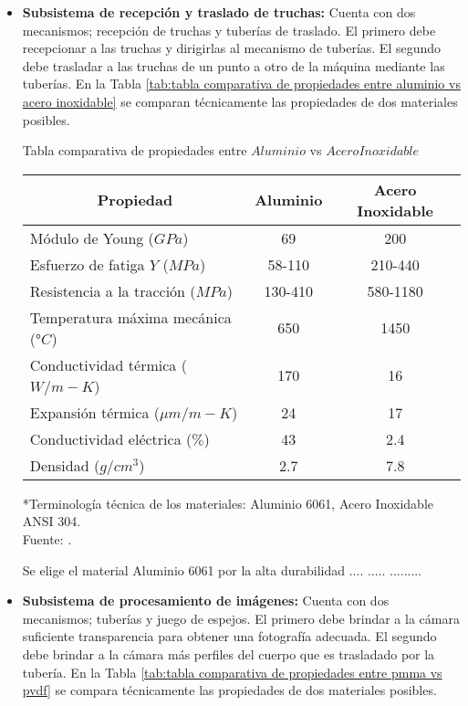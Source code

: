 \begin{itemize}
	\item \textbf{Subsistema de recepción y traslado de truchas:} Cuenta con dos mecanismos; recepción de truchas y tuberías de traslado. El primero debe recepcionar a las truchas y dirigirlas al mecanismo de tuberías. El segundo debe trasladar a las truchas de un punto a otro de la máquina mediante las tuberías. En la Tabla \ref{tab:tabla comparativa de propiedades entre aluminio vs acero inoxidable} se comparan técnicamente las propiedades de dos materiales posibles.
	
	\begin{mytable}[H]
		\centering
		\caption{Tabla comparativa de propiedades entre $Aluminio$ vs $Acero Inoxidable$}
		\label{tab:tabla comparativa de propiedades entre aluminio vs acero inoxidable}
		\begin{tabular}{|l|c|c|}
			\hline
			\multicolumn{1}{|c|}{\textbf{Propiedad}} & \textbf{Aluminio} & \textbf{Acero Inoxidable} \\ \hline
			Módulo de Young ($GPa$) & 69 & 200 \\ \hline
			Esfuerzo de fatiga $Y$ ($MPa$) & 58-110 & 210-440 \\ \hline
			Resistencia a la tracción ($MPa$) & 130-410 & 580-1180 \\ \hline
			Temperatura máxima mecánica (°$C$) & 650 & 1450 \\ \hline
			Conductividad térmica ($W/m-K$) & 170 & 16 \\ \hline
			Expansión térmica (${\mu}m/m-K$) & 24 & 17 \\ \hline
			Conductividad eléctrica ($\%$) & 43 & 2.4 \\ \hline
			Densidad ($g/cm^3$) & 2.7 & 7.8 \\ \hline
		\end{tabular}
		\begin{flushleft}
			*Terminología técnica de los materiales: Aluminio 6061, Acero Inoxidable ANSI 304.\\		
			Fuente: \cite{MakeItFrom2020}.
		\end{flushleft}
	\end{mytable}

	Se elige el material Aluminio 6061 por la alta durabilidad .... ..... .........
	
	\item \textbf{Subsistema de procesamiento de imágenes:} Cuenta con dos mecanismos; tuberías y juego de espejos. El primero debe brindar a la cámara suficiente transparencia para obtener una fotografía adecuada. El segundo debe brindar a la cámara más perfiles del cuerpo que es trasladado por la tubería. En la Tabla \ref{tab:tabla comparativa de propiedades entre pmma vs pvdf} se compara técnicamente las propiedades de dos materiales posibles.
	

\end{itemize}
